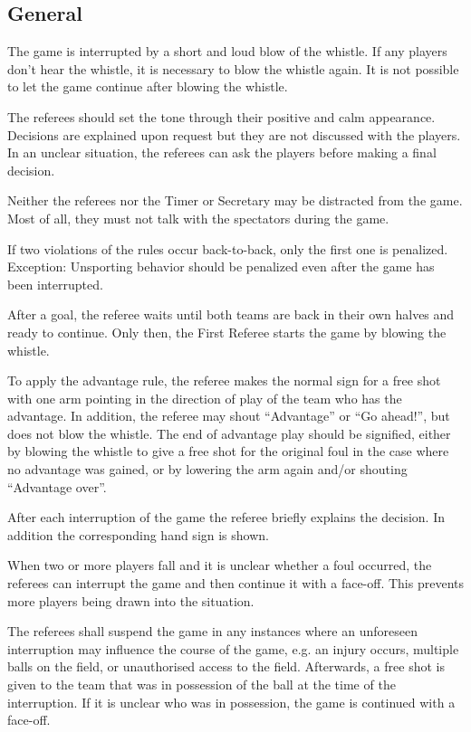 \subsection{General}
The game is interrupted by a short and loud blow of the whistle.
If any players don't hear the whistle, it is necessary to blow the whistle again.
It is not possible to let the game continue after blowing the whistle.

The referees should set the tone through their positive and calm appearance.
Decisions are explained upon request but they are not discussed with the players.
In an unclear situation, the referees can ask the players before making a final decision.

Neither the referees nor the Timer or Secretary may be distracted from the game.
Most of all, they must not talk with the spectators during the game.

If two violations of the rules occur back-to-back, only the first one is penalized.
Exception: Unsporting behavior should be penalized even after the game has been interrupted.

After a goal, the referee waits until both teams are back in their own halves and ready to continue.
Only then, the First Referee starts the game by blowing the whistle.

To apply the advantage rule, the referee makes the normal sign for a free shot with one arm pointing in the direction of play of the team who has the advantage.
In addition, the referee may shout ``Advantage'' or ``Go ahead!'', but does not blow the whistle.
The end of advantage play should be signified, either by blowing the whistle to give a free shot for the original foul in the case where no advantage was gained, or by lowering the arm again and/or shouting ``Advantage over''.

After each interruption of the game the referee briefly explains the decision.
In addition the corresponding hand sign is shown.

When two or more players fall and it is unclear whether a foul occurred, the referees can interrupt the game and then continue it with a face-off.
This prevents more players being drawn into the situation.

The referees shall suspend the game in any instances where an unforeseen interruption may influence the course of the game, e.g. an injury occurs, multiple balls on the field, or unauthorised access to the field.
Afterwards, a free shot is given to the team that was in possession of the ball at the time of the interruption.
If it is unclear who was in possession, the game is continued with a face-off.

